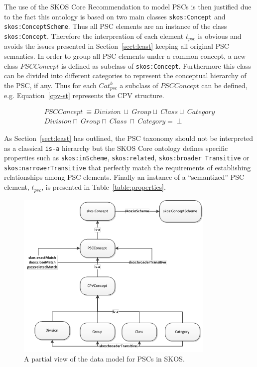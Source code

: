 \begin{itemize}
 The use of the SKOS Core Recommendation to model PSCs is then justified due to the fact this ontology is based on two 
 main classes \texttt{skos:Concept} and \texttt{skos:ConceptScheme}. Thus all PSC elements are 
 an instance of the class \texttt{skos:Concept}. Therefore the interpreation of each element $t_{psc}$ 
 is obvious and avoids the issues presented in Section~\ref{sect:least} keeping all original PSC semantics. In order 
 to group all PSC elements under a common concept, a new class $PSCConcept$ is defined as subclass of 
 \texttt{skos:Concept}. Furthermore this class can be divided into different categories to represent 
 the conceptual hierarchy of the PSC, if any. Thus for each $Cat_{psc}^k$ a subclass of $PSCConcept$ can be defined, e.g. 
 Equation~\ref{cpv-st} represents the CPV structure.
 
 \begin{equation}\label{cpv-st}
 \begin{split}
 PSCConcept\ \equiv Division\ \sqcup\ Group \sqcup\ Class \sqcup\ Category \\
 Division \sqcap\ Group \sqcap\ Class\ \sqcap\ Category = \perp
 \end{split}
\end{equation}

  As Section~\ref{sect:least} has outlined, the PSC taxonomy should not be interpreted as a classical \texttt{is-a} hierarchy but 
  the SKOS Core ontology defines specific properties such as \texttt{skos:inScheme}, \texttt{skos:related}, \texttt{skos:broader Transitive} or
  \texttt{skos:narrowerTransitive} that perfectly match the requirements of establishing relationships among PSC elements. Finally an 
  instance of a ``semantized'' PSC element, $t_{psc}$, is presented in Table~\ref{table:properties}. 
  
 \begin{figure}[!ht]
\centering
	\includegraphics[width=\textwidth]{./imgs/fig-2}
 \caption{A partial view of the data model for PSCs in SKOS.}
 \label{fig:pscs-data-model}
\end{figure}


\end{itemize}
